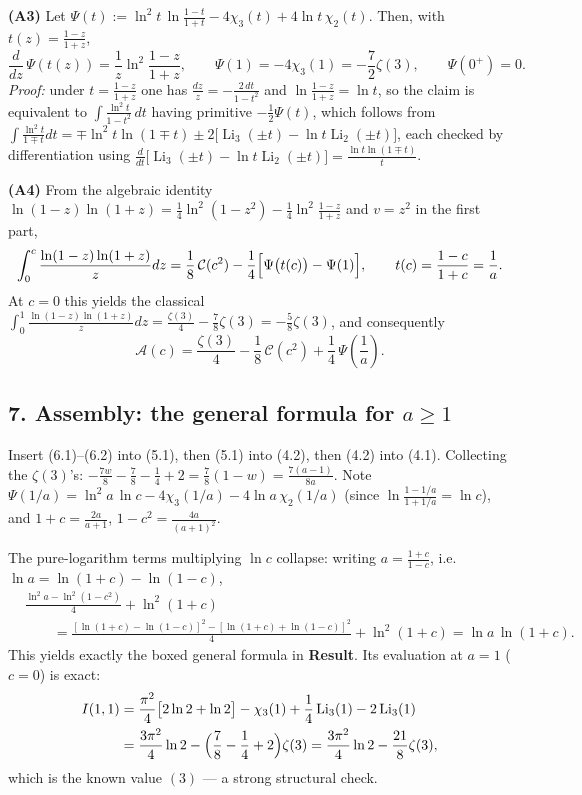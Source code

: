 \documentclass[11pt]{article}
\theoremstyle{remark}
\begin{document}
\textbf{(A3)} Let $\Psi(t):=\ln^2t\,\ln\frac{1-t}{1+t}-4\chi_3(t)+4\ln t\,\chi_2(t)$. Then, with $t(z)=\frac{1-z}{1+z}$,
\[\frac{d}{dz}\,\Psi(t(z))=\frac{1}{z}\ln^2\frac{1-z}{1+z},\qquad \Psi(1)=-4\chi_3(1)=-\frac72\zeta(3),\qquad \Psi(0^+)=0 .\]
\emph{Proof:} under $t=\frac{1-z}{1+z}$ one has $\frac{dz}{z}=-\frac{2\,dt}{1-t^2}$ and $\ln\frac{1-z}{1+z}=\ln t$, so the claim is equivalent to $\int\frac{\ln^2 t}{1-t^2}\,dt$ having primitive $-\frac12\Psi(t)$, which follows from
$\int\frac{\ln^2t}{1\mp t}dt=\mp\ln^2t\ln(1\mp t)\pm2\bigl[\operatorname{Li}_3(\pm t)-\ln t\operatorname{Li}_2(\pm t)\bigr]$,
each checked by differentiation using $\frac{d}{dt}\bigl[\operatorname{Li}_3(\pm t)-\ln t\operatorname{Li}_2(\pm t)\bigr]=\frac{\ln t\ln(1\mp t)}{t}$.

\textbf{(A4)} From the algebraic identity $\ln(1-z)\ln(1+z)=\frac14\ln^2(1-z^2)-\frac14\ln^2\frac{1-z}{1+z}$ and $v=z^2$ in the first part,
\[\int_0^c\frac{\ln(1-z)\ln(1+z)}{z}dz=\frac18\,\mathcal C(c^2)-\frac14\Bigl[\Psi\bigl(t(c)\bigr)-\Psi(1)\Bigr],
\qquad t(c)=\frac{1-c}{1+c}=\frac1a .\]
At $c=0$ this yields the classical $\int_0^1\frac{\ln(1-z)\ln(1+z)}{z}dz=\frac{\zeta(3)}4-\frac78\zeta(3)=-\frac58\zeta(3)$, and consequently
\begin{equation}
\mathcal A(c)=\frac{\zeta(3)}{4}-\frac18\,\mathcal C(c^2)+\frac14\,\Psi\!\left(\frac1a\right). \tag{6.2}
\end{equation}

\subsection*{7. Assembly: the general formula for $a\ge1$}

Insert (6.1)--(6.2) into (5.1), then (5.1) into (4.2), then (4.2) into (4.1). Collecting the $\zeta(3)$'s:
$-\frac{7w}{8}-\frac78-\frac14+2=\frac78(1-w)=\frac{7(a-1)}{8a}$. Note $\Psi(1/a)=\ln^2a\,\ln c-4\chi_3(1/a)-4\ln a\,\chi_2(1/a)$ (since $\ln\frac{1-1/a}{1+1/a}=\ln c$), and $1+c=\frac{2a}{a+1}$, $1-c^2=\frac{4a}{(a+1)^2}$.

The pure-logarithm terms multiplying $\ln c$ collapse: writing $a=\frac{1+c}{1-c}$, i.e. $\ln a=\ln(1+c)-\ln(1-c)$,
\[\begin{aligned}
&\frac{\ln^2a-\ln^2(1-c^2)}{4}+\ln^2(1+c)\\
&\qquad=\frac{[\ln(1+c)-\ln(1-c)]^2-[\ln(1+c)+\ln(1-c)]^2}{4}+\ln^2(1+c)
=\ln a\,\ln(1+c).
\end{aligned}\]
This yields exactly the boxed general formula in \textbf{Result}. Its evaluation at $a=1$ ($c=0$) is exact:
\[\begin{aligned}
I(1,1)&=\frac{\pi^2}{4}\bigl[2\ln2+\ln2\bigr]-\chi_3(1)+\frac14\operatorname{Li}_3(1)-2\operatorname{Li}_3(1)\\
&=\frac{3\pi^2}{4}\ln2-\Bigl(\frac78-\frac14+2\Bigr)\zeta(3)=\frac{3\pi^2}{4}\ln2-\frac{21}{8}\zeta(3),
\end{aligned}\]
which is the known value $(3)$ --- a strong structural check.
\end{document}
